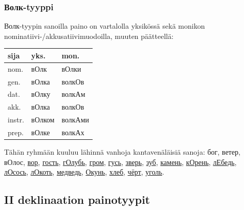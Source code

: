 \documentclass[]{scrreprt}
\begin{document}
\subsubsection{Волк-tyyppi}\label{ux432ux43eux43bux43a-tyyppi}

Волк-tyypin sanoilla paino on vartalolla yksikössä sekä monikon
nominatiivi-/akkusatiivimuodoilla, muuten päätteellä:

\begin{longtable}[c]{@{}lll@{}}
\toprule
sija & yks. & mon.\tabularnewline
\midrule
\endhead
nom. & вОлк & вОлки\tabularnewline
gen. & вОлка & волкОв\tabularnewline
dat. & вОлку & волкАм\tabularnewline
akk. & вОлка & волкОв\tabularnewline
instr. & вОлком & волкАми\tabularnewline
prep. & вОлке & волкАх\tabularnewline
\bottomrule
\end{longtable}

Tähän ryhmään kuuluu lähinnä vanhoja kantavenäläisiä sanoja: бог, ветер,
вОлос,
\href{http://ru.wiktionary.org/wiki/\%D0\%B2\%D0\%BE\%D1\%80}{вор},
\href{http://ru.wiktionary.org/wiki/\%D0\%B3\%D0\%BE\%D1\%81\%D1\%82\%D1\%8C}{гость},
\href{http://ru.wiktionary.org/wiki/\%D0\%B3\%D0\%BE\%D0\%BB\%D1\%83\%D0\%B1\%D1\%8C}{гОлубь},
\href{http://ru.wiktionary.org/wiki/\%D0\%B3\%D1\%80\%D0\%BE\%D0\%BC}{гром},
\href{http://ru.wiktionary.org/wiki/\%D0\%B3\%D1\%83\%D1\%81\%D1\%8C}{гусь},
\href{http://ru.wiktionary.org/wiki/\%D0\%B7\%D0\%B2\%D0\%B5\%D1\%80\%D1\%8C}{зверь},
\href{http://ru.wiktionary.org/wiki/\%D0\%B7\%D1\%83\%D0\%B1}{зуб},
\href{http://ru.wiktionary.org/wiki/\%D0\%BA\%D0\%B0\%D0\%BC\%D0\%B5\%D0\%BD\%D1\%8C}{камень},
\href{http://ru.wiktionary.org/wiki/\%D0\%BA\%D0\%BE\%D1\%80\%D0\%B5\%D0\%BD\%D1\%8C}{кОрень},
\href{http://ru.wiktionary.org/wiki/\%D0\%BB\%D0\%B5\%D0\%B1\%D0\%B5\%D0\%B4\%D1\%8C}{лЕбедь},
\href{http://ru.wiktionary.org/wiki/\%D0\%BB\%D0\%BE\%D1\%81\%D0\%BE\%D1\%81\%D1\%8C}{лОсось},
\href{http://ru.wiktionary.org/wiki/\%D0\%BB\%D0\%BE\%D0\%BA\%D0\%BE\%D1\%82\%D1\%8C}{лОкоть},
\href{http://ru.wiktionary.org/wiki/\%D0\%BC\%D0\%B5\%D0\%B4\%D0\%B2\%D0\%B5\%D0\%B4\%D1\%8C}{медведь},
\href{http://ru.wiktionary.org/wiki/\%D0\%BE\%D0\%BA\%D1\%83\%D0\%BD\%D1\%8C}{Окунь},
\href{http://ru.wiktionary.org/wiki/\%D1\%85\%D0\%BB\%D0\%B5\%D0\%B1}{хлеб},
\href{http://ru.wiktionary.org/wiki/\%D1\%87\%D1\%91\%D1\%80\%D1\%82}{чёрт},
\href{http://ru.wiktionary.org/wiki/\%D1\%83\%D0\%B3\%D0\%BE\%D0\%BB\%D1\%8C}{уголь}.

\subsection{II deklinaation
painotyypit}\label{ii-deklinaation-painotyypit}
\end{document}

